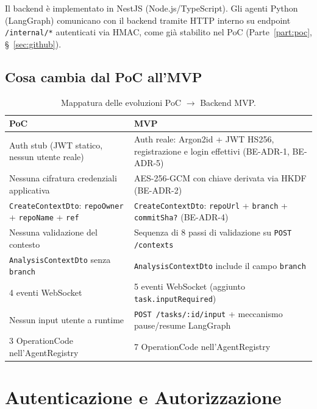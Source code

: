 \documentclass[11pt,a4paper]{article}
\begin{document}
Il backend è implementato in NestJS (Node.js/TypeScript). Gli agenti Python (LangGraph) comunicano con il backend tramite HTTP interno su endpoint \texttt{/internal/*} autenticati via HMAC, come già stabilito nel PoC (Parte~\ref{part:poc}, \S~\ref{sec:github}).

\subsection{Cosa cambia dal PoC all'MVP}

\begin{table}[H]
\centering
\caption{Mappatura delle evoluzioni PoC $\to$ Backend MVP.}
\label{tab:be-mappatura}
\vspace{2mm}
\renewcommand{\arraystretch}{1.2}
\begin{tabularx}{\textwidth}{|X|X|}
\hline
\textbf{PoC} & \textbf{MVP} \\ \hline
Auth stub (JWT statico, nessun utente reale) & Auth reale: Argon2id + JWT HS256, registrazione e login effettivi (BE-ADR-1, BE-ADR-5) \\ \hline
Nessuna cifratura credenziali applicativa & AES-256-GCM con chiave derivata via HKDF (BE-ADR-2) \\ \hline
\texttt{CreateContextDto}: \texttt{repoOwner} + \texttt{repoName} + \texttt{ref} & \texttt{CreateContextDto}: \texttt{repoUrl} + \texttt{branch} + \texttt{commitSha?} (BE-ADR-4) \\ \hline
Nessuna validazione del contesto & Sequenza di 8 passi di validazione su \texttt{POST /contexts} \\ \hline
\texttt{AnalysisContextDto} senza \texttt{branch} & \texttt{AnalysisContextDto} include il campo \texttt{branch} \\ \hline
4 eventi WebSocket & 5 eventi WebSocket (aggiunto \texttt{task.inputRequired}) \\ \hline
Nessun input utente a runtime & \texttt{POST /tasks/:id/input} + meccanismo pause/resume LangGraph \\ \hline
3 OperationCode nell'AgentRegistry & 7 OperationCode nell'AgentRegistry \\ \hline
\end{tabularx}
\end{table}

\section{Autenticazione e Autorizzazione}
\label{sec:be-auth}
\end{document}
